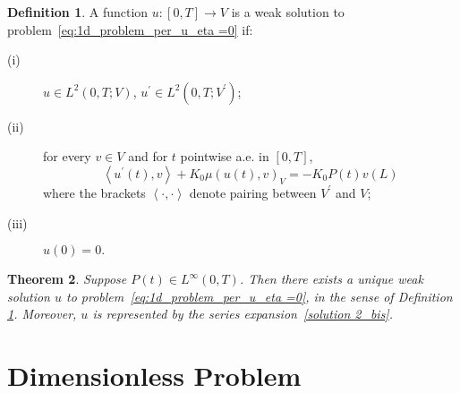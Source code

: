 \documentclass[12pt,a4paper]{amsart}
\newtheorem{theorem}{Theorem}[section]
\theoremstyle{definition}
\newtheorem{definition}[theorem]{Definition}
\begin{document}
\begin{definition}
\label{def weak sol eta=0}A function $u:\left[ 0,T\right] \rightarrow V$ is a weak
solution to problem~\eqref{eq:1d_problem_per_u_eta =0} if:

\begin{description}
\item[(i)] $u\in L^{2}\left( 0,T;V\right) $, $u^{\prime }\in L^{2}\left(
0,T;V^{\prime }\right) $;

\item[(ii)] for every $v\in V$ and for $t$ pointwise a.e. in $\left[ 0,T%
\right] $,
\begin{equation}
\left\langle u^{\prime }\left( t\right) ,v\right\rangle +K_{0}\mu \left(
u\left( t\right) ,v\right) _{V}=-K_{0}P\left( t\right) v\left( L\right)
\label{PDE weak eta=0}
\end{equation}
where the brackets $\left\langle \cdot ,\cdot \right\rangle $ denote pairing between $V^{\prime }$ and $V$;

\item[(iii)] $u\left( 0\right) =0.$
\end{description}
\end{definition}

\begin{theorem}
Suppose $P(t)\in L^{\infty }(0,T)$. Then there exists a unique weak solution $u$
to problem~\eqref{eq:1d_problem_per_u_eta =0}, in the sense of Definition \ref{def weak sol eta=0}. Moreover, $u$
is represented by the series expansion~\eqref{solution 2_bis}.
\end{theorem}


\section{Dimensionless Problem}\label{sec:dimensionless_problem}
\end{document}
